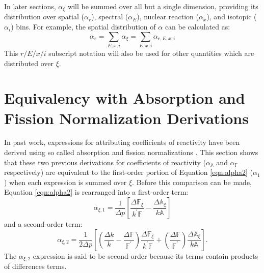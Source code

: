\documentclass[11pt]{article}
\newcommand{\A}[0]{\mathbb{A}}
\newcommand{\F}[0]{\mathbb{F}}
\begin{document}
In later sections, $\alpha_\xi$ will be summed over all but a single dimension, providing its distribution over spatial ($\alpha_r$), spectral ($\alpha_E$), nuclear reaction ($\alpha_x$), and isotopic ($\alpha_i$) bins.
For example, the spatial distribution of $\alpha$ can be calculated as:
\begin{equation}
    \alpha_r = \sum_{E,x,i} \alpha_\xi  = \sum_{E,x,i} \alpha_{r,E,x,i}
\end{equation}
This $r/E/x/i$ subscript notation will also be used for other quantities which are distributed over $\xi$.

\section{Equivalency with Absorption and Fission Normalization Derivations}
\label{sec:equiv}

In past work, expressions for attributing coefficients of reactivity have been derived using so called absorption and fission normalizations \cite{ganda2010sst}.
This section shows that these two previous derivations for coefficients of reactivity ($\alpha_\A$ and $\alpha_\F$ respectively) are equivalent to the first-order portion of Equation \ref{eqn:alpha2} ($\alpha_1$) when each expression is summed over $\xi$.
Before this comparison can be made, Equation \ref{eqn:alpha2} is rearranged into a first-order term:
\begin{equation}
    \alpha_{\xi,1} = \frac{1}{\Delta p} \left[\frac{\Delta\F_\xi}{k^\prime\F} - \frac{\Delta\A_\xi}{k\A}\right]
    \label{eqn:alpha1}
\end{equation}
and a second-order term:
\begin{equation}
    \alpha_{\xi,2} = \frac{1}{2\Delta p} \left[\left(\frac{\Delta k}{k} - \frac{\Delta\F}{\F^\prime}\right)\frac{\Delta\F_\xi}{k^\prime \F} + \left(\frac{\Delta\F}{\F^\prime}\right)\frac{\Delta\A_\xi}{k\A}\right].
\end{equation}
The $\alpha_{\xi,2}$ expression is said to be second-order because its terms contain products of differences terms.
\end{document}
